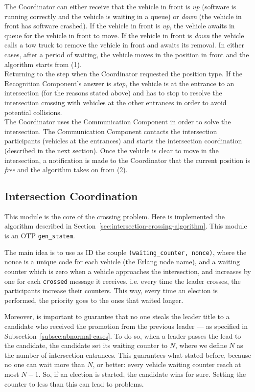 \documentclass{memoir}
\begin{document}
The Coordinator can either receive that the vehicle in front is \textit{up} (software is running correctly and the vehicle is waiting in a queue) or  \textit{down} (the vehicle in front has software crashed). If the vehicle in front is \textit{up}, the vehicle awaits in queue for the vehicle in front to move. If the vehicle in front is \textit{down} the vehicle calls a tow truck to remove the vehicle in front and awaits its removal.
In either cases, after a period of waiting, the vehicle moves in the position in front and the algorithm starts from (1).
\\

Returning to the step when the Coordinator requested the position type. If the Recognition Component’s answer is \textit{stop}, the vehicle is at the entrance to an intersection (for the reasons stated above) and has to stop to resolve the intersection crossing with vehicles at the other entrances in order to avoid potential collisions.
\\

The Coordinator uses the Communication Component in order to solve the intersection. The Communication Component contacts the intersection participants (vehicles at the entrances) and starts the intersection coordination (described in the next section). Once the vehicle is clear to move in the intersection, a notification is made to the Coordinator that the current position is \textit{free} and the algorithm takes on from (2).

\subsection{Intersection Coordination}
This module is the core of the crossing problem. Here is implemented the algorithm described in Section~\ref{sec:intersection-crossing-algorithm}. This module is an OTP \verb|gen_statem|.

The main idea is to use as ID the couple \verb|(waiting_counter, nonce)|, where the nonce is a unique code for each vehicle (the Erlang node name), and a waiting counter which is zero when a vehicle approaches the intersection, and increases by one for each \verb|crossed| message it receives, i.e. every time the leader crosses, the participants increase their counters. This way, every time an election is performed, the priority goes to the ones that waited longer. 

Moreover, is important to guarantee that no one steals the leader title to a candidate who received the promotion from the previous leader --- as specified in Subsection~\ref{subsec:abnormal-cases}. To do so, when a leader passes the lead to the candidate, the candidate set its waiting counter to $N$, where we define $N$ as the number of intersection entrances. This guarantees what stated before, because no one can wait more than $N$, or better: every vehicle waiting counter reach at most $N - 1$. So, if an election is started, the candidate wins for sure. Setting the counter to less than this can lead to problems.
\end{document}
